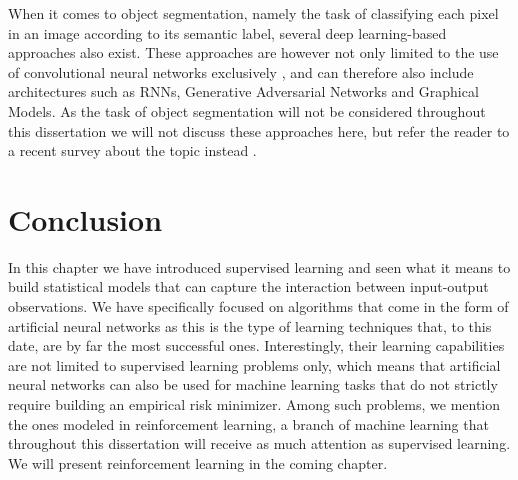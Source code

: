 When it comes to object segmentation, namely the task of classifying each pixel in an image according to its semantic label, several deep learning-based approaches also exist. These approaches are however not only limited to the use of convolutional neural networks exclusively \cite{minaee2021image}, and can therefore also include architectures such as RNNs, Generative Adversarial Networks and Graphical Models. As the task of object segmentation will not be considered throughout this dissertation we will not discuss these approaches here, but refer the reader to a recent survey about the topic instead \cite{minaee2021image}. 


\section{Conclusion}
\label{sec:conclusion01}
In this chapter we have introduced supervised learning and seen what it means to build statistical models that can capture the interaction between input-output observations. We have specifically focused on algorithms that come in the form of artificial neural networks as this is the type of learning techniques that, to this date, are by far the most successful ones. Interestingly, their learning capabilities are not limited to supervised learning problems only, which means that artificial neural networks can also be used for machine learning tasks that do not strictly require building an empirical risk minimizer. Among such problems, we mention the ones modeled in reinforcement learning, a branch of machine learning that throughout this dissertation will receive as much attention as supervised learning. We will present reinforcement learning in the coming chapter.
